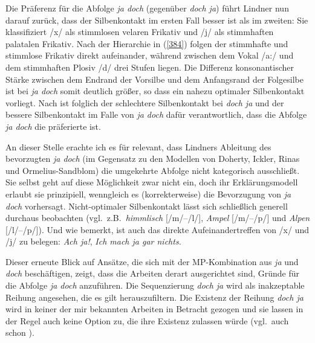Die Präferenz für die Abfolge \textit{ja doch} (gegenüber \textit{doch ja}) führt Lindner nun darauf zurück, dass der Silbenkontakt im ersten Fall besser ist als im zweiten: Sie klassifiziert /x/ als stimmlosen velaren Frikativ und /j/ als stimmhaften palatalen Frikativ. Nach der Hierarchie in (\ref{384}) folgen der stimmhafte und stimmlose Frikativ direkt aufeinander, während zwischen dem Vokal /a:/ und dem stimmhaften Plosiv /d/ drei Stufen liegen. Die Differenz konsonantischer Stärke zwischen dem Endrand der Vorsilbe und dem Anfangsrand der Folgesilbe ist bei \textit{ja doch} somit deutlich größer, so dass ein nahezu optimaler Silbenkontakt vorliegt. Nach \citet{Lindner1991} ist folglich der schlechtere Silbenkontakt bei \textit{doch ja} und der bessere Silbenkontakt im Falle von \textit{ja doch} dafür verantwortlich, dass die Abfolge \textit{ja doch} die präferierte ist.

An dieser Stelle erachte ich es für relevant, dass Lindners Ableitung des bevor\-zugten \textit{ja doch} (im Gegensatz zu den Modellen von Doherty, Ickler, Rinas und Ormelius-Sandblom) die umgekehr\-te Abfolge nicht kategorisch ausschließt. Sie selbst geht auf diese Möglichkeit zwar nicht ein, doch ihr Erklärungsmodell erlaubt sie prinzi\-piell, wenngleich es (korrekterweise) die Bevorzugung von \textit{ja doch} vorhersagt. Nicht-optimaler Silbenkontakt lässt sich schließlich generell durchaus beobachten (vgl.\ z.B.\ \textit{himmlisch} [/m/–/l/], \textit{Ampel} [/m/–/p/] und \textit{Alpen} [/l/–/p/]). Und wie \citet[430]{Rinas2007} bemerkt, ist auch das direkte Aufein\-andertreffen von /x/ und /j/ zu belegen: \textit{Ach ja!}, \textit{Ich mach ja gar nichts.}

Dieser erneute Blick auf Ansätze, die sich mit der MP-Kombination aus \textit{ja} und \textit{doch} beschäftigen, zeigt, dass die Arbeiten derart ausgerichtet sind, Gründe für die Abfolge \textit{ja doch} anzuführen. Die Sequenzierung \textit{doch ja} wird als inakzeptable Reihung angesehen, die es gilt herauszufiltern. Die Existenz der Reihung \textit{doch ja} wird in keiner der mir bekannten Arbeiten in Betracht gezogen und sie lassen in der Regel auch keine Option zu, die ihre E\-xistenz zulassen würde (vgl.\ auch schon \citealt[170--175]{Mueller2014a}).

